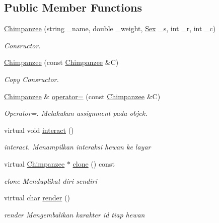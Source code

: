 \subsection*{Public Member Functions}
\begin{DoxyCompactItemize}
\item 
\hyperlink{classChimpanzee_a147026737472ddf50fc10f72ad1d8234}{Chimpanzee} (string \+\_\+name, double \+\_\+weight, \hyperlink{sex_8h_a2633cb393c68bb2ee8080db58fb7ba93}{Sex} \+\_\+s, int \+\_\+r, int \+\_\+c)
\begin{DoxyCompactList}\small\item\em Consructor. \end{DoxyCompactList}\item 
\hyperlink{classChimpanzee_a74d8984840f0090f2966d226501bdd92}{Chimpanzee} (const \hyperlink{classChimpanzee}{Chimpanzee} \&C)
\begin{DoxyCompactList}\small\item\em Copy Consructor. \end{DoxyCompactList}\item 
\hyperlink{classChimpanzee}{Chimpanzee} \& \hyperlink{classChimpanzee_a9ad895dc0a2fe9912c948c62f3637844}{operator=} (const \hyperlink{classChimpanzee}{Chimpanzee} \&C)
\begin{DoxyCompactList}\small\item\em Operator=. Melakukan assignment pada objek. \end{DoxyCompactList}\item 
virtual void \hyperlink{classChimpanzee_aade8161c7bcd697eae3d5a3559f6d976}{interact} ()
\begin{DoxyCompactList}\small\item\em interact. Menampilkan interaksi hewan ke layar \end{DoxyCompactList}\item 
virtual \hyperlink{classChimpanzee}{Chimpanzee} $\ast$ \hyperlink{classChimpanzee_ab4e4e896ca7461d22c526e5a86602903}{clone} () const 
\begin{DoxyCompactList}\small\item\em clone Menduplikat diri sendiri \end{DoxyCompactList}\item 
virtual char \hyperlink{classChimpanzee_acad5b9a73a684b44138e842326090357}{render} ()
\begin{DoxyCompactList}\small\item\em render Mengembalikan karakter id tiap hewan \end{DoxyCompactList}\item 

\end{DoxyCompactItemize}
